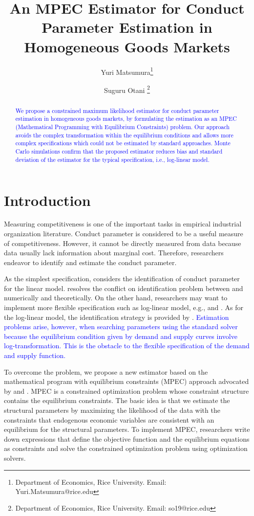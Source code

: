 \documentclass[11pt, a4paper]{article}
\title{An MPEC Estimator for Conduct Parameter Estimation in Homogeneous Goods Markets}
\author{Yuri Matsumura\thanks{Department of Economics, Rice University. Email: Yuri.Matsumura@rice.edu} \and Suguru Otani \thanks{Department of Economics, Rice University. Email: so19@rice.edu
}}
\begin{document}
\maketitle
\begin{abstract}
    \textcolor{blue}{We propose a constrained maximum likelihood estimator for conduct parameter estimation in homogeneous goods markets, by formulating the estimation as an MPEC (Mathematical Programming with Equilibrium Constraints) problem. Our approach avoids the complex transformation within the equilibrium conditions and allows more complex specifications which could not be estimated by standard approaches. Monte Carlo simulations confirm that the proposed estimator reduces bias and standard deviation of the estimator for the typical specification, i.e., log-linear model.%
    }
\end{abstract}


\section{Introduction}
Measuring competitiveness is one of the important tasks in empirical industrial organization literature.
Conduct parameter is considered to be a useful measure of competitiveness. 
However, it cannot be directly measured from data because data usually lack information about marginal cost.
Therefore, researchers endeavor to identify and estimate the conduct parameter.

As the simplest specification, \citet{bresnahan1982oligopoly} considers the identification of conduct parameter for the linear model. \cite{matsumura2023revisiting} resolves the conflict on identification problem between \cite{bresnahan1982oligopoly} and \cite{perloff2012collinearity} numerically and theoretically. On the other hand, researchers may want to implement more flexible specification such as log-linear model, e.g., \cite{okazaki2022excess} and \cite{merel2009measuring}. As for the log-linear model, the identification strategy is provided by \citet{lau1982identifying}. 
\textcolor{blue}{Estimation problems arise, however, when searching parameters using the standard solver because the equilibrium condition given by demand and supply curves involve log-transformation. This is the obstacle to the flexible specification of the demand and supply function.}


To overcome the problem, we propose a new estimator based on the mathematical program with equilibrium constraints (MPEC) approach advocated by \cite{su2012constrained} and \cite{dube2012improving}. MPEC is a constrained optimization problem whose constraint structure contains the equilibrium constraints. The basic idea is that we estimate the structural parameters by maximizing the likelihood of the data with the constraints that endogenous economic variables are consistent with an equilibrium for the structural parameters. To implement MPEC, researchers write down expressions that define the objective function and the equilibrium equations as constraints and solve the constrained optimization problem using optimization solvers. 
\end{document}

